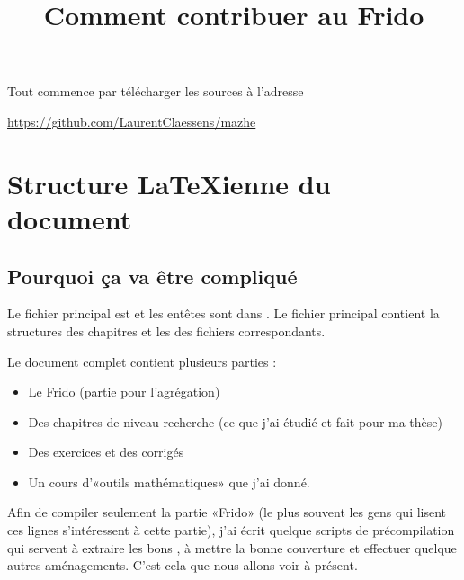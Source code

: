 




\title{Comment contribuer au Frido}
\maketitle

\tableofcontents

Tout commence par télécharger les sources à l'adresse
\begin{center}
    \url{https://github.com/LaurentClaessens/mazhe}
\end{center}

\section{Structure \LaTeX ienne du document}

\subsection{Pourquoi ça va être compliqué}

Le fichier principal est  et les entêtes sont dans . Le fichier principal contient la structures des chapitres et les  des fichiers correspondants.

Le document complet contient plusieurs parties :
\begin{itemize}
    \item Le Frido (partie pour l'agrégation)
    \item Des chapitres de niveau recherche (ce que j'ai étudié et fait pour ma thèse)
    \item Des exercices et des corrigés
    \item Un cours d'«outils mathématiques» que j'ai donné.
\end{itemize}
Afin de compiler seulement la partie «Frido» (le plus souvent les gens qui lisent ces lignes s'intéressent à cette partie), j'ai écrit quelque scripts de précompilation qui servent à extraire les bons , à mettre la bonne couverture et effectuer quelque autres aménagements. C'est cela que nous allons voir à présent.

